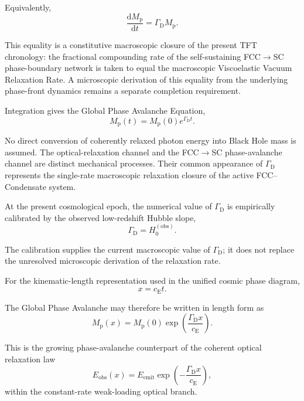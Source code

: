 Equivalently,
\begin{equation}
    \frac{\mathrm{d}M_{\mathrm{p}}}{\mathrm{d}t}
    =
    \Gamma_{\mathrm{D}}M_{\mathrm{p}}.
\end{equation}

This equality is a constitutive macroscopic closure of the present TFT chronology: the fractional compounding rate of the self-sustaining FCC$\rightarrow$SC phase-boundary network is taken to equal the macroscopic Viscoelastic Vacuum Relaxation Rate. A microscopic derivation of this equality from the underlying phase-front dynamics remains a separate completion requirement.

Integration gives the Global Phase Avalanche Equation,
\begin{equation}
    M_{\mathrm{p}}(t)
    =
    M_{\mathrm{p}}(0)
    e^{\Gamma_{\mathrm{D}}t}.
\end{equation}

No direct conversion of coherently relaxed photon energy into Black Hole mass is assumed. The optical-relaxation channel and the FCC$\rightarrow$SC phase-avalanche channel are distinct mechanical processes. Their common appearance of $\Gamma_{\mathrm{D}}$ represents the single-rate macroscopic relaxation closure of the active FCC--Condensate system.

At the present cosmological epoch, the numerical value of $\Gamma_{\mathrm{D}}$ is empirically calibrated by the observed low-redshift Hubble slope,
\begin{equation}
    \Gamma_{\mathrm{D}}
    =
    H_0^{(\mathrm{obs})}.
\end{equation}

The calibration supplies the current macroscopic value of $\Gamma_{\mathrm{D}}$; it does not replace the unresolved microscopic derivation of the relaxation rate.

For the kinematic-length representation used in the unified cosmic phase diagram,
\begin{equation}
    x=c_{\mathrm{E}}t.
\end{equation}

The Global Phase Avalanche may therefore be written in length form as
\begin{equation}
    M_{\mathrm{p}}(x)
    =
    M_{\mathrm{p}}(0)
    \exp\left(
        \frac{\Gamma_{\mathrm{D}}x}
        {c_{\mathrm{E}}}
    \right).
\end{equation}

This is the growing phase-avalanche counterpart of the coherent optical relaxation law
\begin{equation}
    E_{\mathrm{obs}}(x)
    =
    E_{\mathrm{emit}}
    \exp\left(
        -\frac{\Gamma_{\mathrm{D}}x}
        {c_{\mathrm{E}}}
    \right),
\end{equation}
within the constant-rate weak-loading optical branch.


